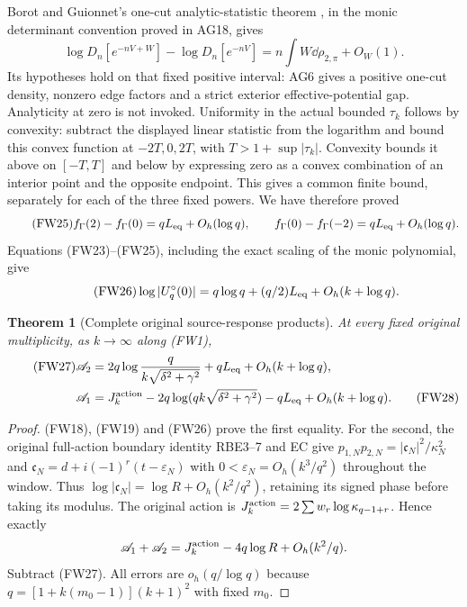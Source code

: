 \documentclass[11pt]{article}
\newtheorem{theorem}{Theorem}\newtheorem{lemma}[theorem]{Lemma}
\begin{document}
Borot and Guionnet's one-cut analytic-statistic theorem
\cite[Propositions 1.2 and 5.2]{BG}, in the monic determinant convention
proved in AG18, gives
\[
 \log D_n[e^{-nV+W}]-\log D_n[e^{-nV}]
       =n\int W\dd\rho_{2,\pi}+O_W(1).
\]
Its hypotheses hold on that fixed positive interval: AG6 gives a positive
one-cut density, nonzero edge factors and a strict exterior effective-potential
gap. Analyticity at zero is not invoked. Uniformity in the actual bounded
$\tau_k$ follows by convexity: subtract the displayed linear statistic
from the logarithm and bound this convex function at $-2T,0,2T$, with
$T>1+\sup|\tau_k|$. Convexity bounds it above on $[-T,T]$ and below by
expressing zero as a convex combination of an interior point and the
opposite endpoint. This gives a common finite bound, separately for each
of the three fixed powers. We have therefore proved
\begin{equation}\tag{FW25}
 f_\Gamma(2)-f_\Gamma(0)=qL_{\rm eq}+O_h(\log q),\qquad
 f_\Gamma(0)-f_\Gamma(-2)=qL_{\rm eq}+O_h(\log q).
\end{equation}
Equations (FW23)--(FW25), including the exact scaling of the monic
polynomial, give
\begin{equation}\tag{FW26}
 \log|U_q^\circ(0)|=q\log q+(q/2)L_{\rm eq}+O_h(k+\log q).
\end{equation}

\begin{theorem}[Complete original source-response products]
At every fixed original multiplicity, as $k\to\infty$ along (FW1),
\begin{align}\tag{FW27}
 \mathscr A_2&=2q\log\frac{q}{k\sqrt{\delta^2+\gamma^2}}
                    +qL_{\rm eq}+O_h(k+\log q),\\
 \mathscr A_1&=J_k^{\rm action}-2q\log(qk\sqrt{\delta^2+\gamma^2})
                    -qL_{\rm eq}+O_h(k+\log q).\tag{FW28}
\end{align}
\end{theorem}
\begin{proof}
(FW18), (FW19) and (FW26) prove the first equality. For the second,
the original full-action boundary identity RBE3--7 and EC give
$p_{1,N}p_{2,N}=|\mathfrak c_N|^2/\kappa_N^2$ and
$\mathfrak c_N=d+i(-1)^r(t-\varepsilon_N)$ with
$0<\varepsilon_N=O_h(k^3/q^2)$ throughout the window.
Thus $\log|\mathfrak c_N|=\log R+O_h(k^2/q^2)$, retaining its signed
phase before taking its modulus. The original action is
$J_k^{\rm action}=2\sum w_r\log\kappa_{q-1+r}$. Hence exactly
\[
 \mathscr A_1+\mathscr A_2=J_k^{\rm action}-4q\log R
                    +O_h(k^2/q).
\]
Subtract (FW27). All errors are $o_h(q/\log q)$ because
$q=[1+k(m_0-1)](k+1)^2$ with fixed $m_0$.
\end{proof}
\end{document}
